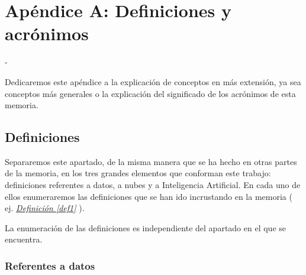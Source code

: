 \chapter{Apéndice A: Definiciones y acrónimos}
\label{Appendix:1}

-

Dedicaremos este apéndice a la explicación de conceptos en más extensión, ya sea conceptos más generales o la explicación del significado de los acrónimos de esta memoria.

\section{Definiciones}

Separaremos este apartado, de la misma manera que se ha hecho en otras partes de la memoria, en los tres grandes elementos que conforman este trabajo: definiciones referentes a datos, a nubes y a Inteligencia Artificial. En cada uno de ellos enumeraremos las definiciones que se han ido incrustando en la memoria ( ej. \hyperref[def1]{\textit{Definición \ref*{def1}}} ).

La enumeración de las definiciones es independiente del apartado en el que se encuentra.

\subsection{Referentes a datos}

